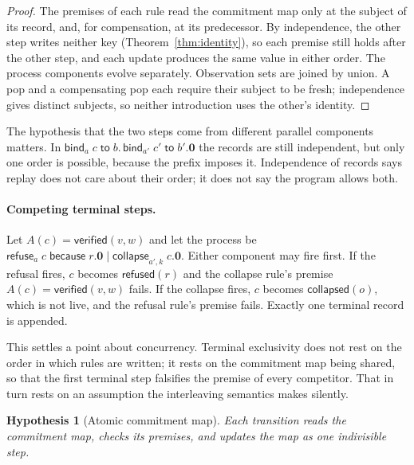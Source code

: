 \documentclass[11pt,openany]{book}
\newtheorem{hypothesis}[theorem]{Hypothesis}
\theoremstyle{remark}
\begin{document}
\begin{proof}
The premises of each rule read the commitment map only at the subject of
its record, and, for compensation, at its predecessor. By independence,
the other step writes neither key (Theorem~\ref{thm:identity}), so each
premise still holds after the other step, and each update produces the
same value in either order. The process components evolve separately.
Observation sets are joined by union. A pop and a compensating pop each
require their subject to be fresh; independence gives distinct subjects,
so neither introduction uses the other's identity.
\end{proof}

The hypothesis that the two steps come from different parallel components
matters. In $\mathsf{bind}_a\;c\;\mathsf{to}\;b.\,
\mathsf{bind}_{a'}\;c'\;\mathsf{to}\;b'.\mathbf 0$ the records are still
independent, but only one order is possible, because the prefix imposes
it. Independence of records says replay does not care about their order;
it does not say the program allows both.

\paragraph{Competing terminal steps.}
Let $A(c)=\mathsf{verified}(v,w)$ and let the process be
$\mathsf{refuse}_a\;c\;\mathsf{because}\;r.\mathbf 0\mid
\mathsf{collapse}_{a',k}\;c.\mathbf 0$. Either component
may fire first. If the refusal fires, $c$ becomes $\mathsf{refused}(r)$ and
the collapse rule's premise $A(c)=\mathsf{verified}(v,w)$ fails. If the
collapse fires, $c$ becomes $\mathsf{collapsed}(o)$, which is not live, and
the refusal rule's premise fails. Exactly one terminal record is appended.

This settles a point about concurrency. Terminal exclusivity does not rest
on the order in which rules are written; it rests on the commitment map
being shared, so that the first terminal step falsifies the premise of
every competitor. That in turn rests on an assumption the interleaving
semantics makes silently.

\begin{hypothesis}[Atomic commitment map]\label{hyp:atomic}
Each transition reads the commitment map, checks its premises, and
updates the map as one indivisible step.
\end{hypothesis}
\end{document}
